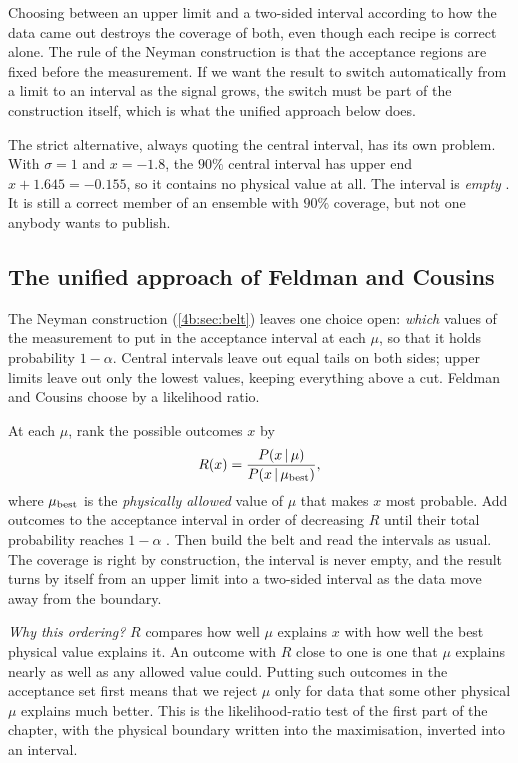 \begin{pitfall}
Choosing between an upper limit and a two-sided interval according to how the
data came out destroys the coverage of both, even though each recipe is
correct alone. The rule of the Neyman construction is that the acceptance
regions are fixed before the measurement. If we want the result to switch
automatically from a limit to an interval as the signal grows, the switch must
be part of the construction itself, which is what the unified approach below
does.
\end{pitfall}

The strict alternative, always quoting the central interval, has its own
problem. With $\sigma=1$ and $x=-1.8$, the $90\%$ central interval has upper end
$x+1.645=-0.155$, so it contains no physical value at all. The interval is
\emph{empty} \cite{FeldmanCousins1998}. It is still a correct member of an
ensemble with $90\%$ coverage, but not one anybody wants to publish.

\subsection{The unified approach of Feldman and Cousins}
\label{4b:sec:fc}

The Neyman construction (\cref{4b:sec:belt}) leaves one choice open:
\emph{which} values of the measurement to put in the acceptance interval at
each $\mu$, so that it holds probability $1-\alpha$. Central intervals leave
out equal tails on both sides; upper limits leave out only the lowest values,
keeping everything above a cut. Feldman and Cousins choose by a likelihood ratio.

\begin{keyidea}
At each $\mu$, rank the possible outcomes $x$ by
\[
  R(x)=\frac{P(x\,\vert\,\mu)}{P(x\,\vert\,\mu_{\rm best})},
\]
where $\mu_{\rm best}$ is the \emph{physically allowed} value of $\mu$ that
makes $x$ most probable. Add outcomes to the acceptance interval in order of
decreasing $R$ until their total probability reaches $1-\alpha$
\cite[(4.1)]{FeldmanCousins1998}. Then build the belt and read the intervals as
usual. The coverage is right by construction, the interval is never empty, and
the result turns by itself from an upper limit into a two-sided interval as the
data move away from the boundary.
\end{keyidea}

\emph{Why this ordering?} $R$ compares how well $\mu$ explains $x$ with how
well the best physical value explains it. An outcome with $R$ close to one is
one that $\mu$ explains nearly as well as any allowed value could. Putting such
outcomes in the acceptance set first means that we reject $\mu$ only for data
that some other physical $\mu$ explains much better. This is the likelihood-ratio test of the
first part of the chapter, with the physical boundary written into the
maximisation, inverted into an interval.

